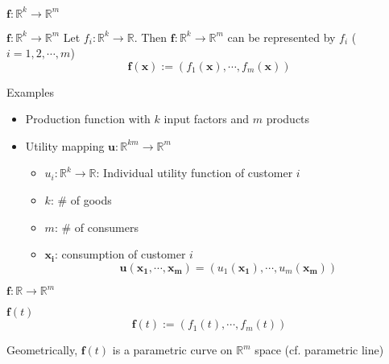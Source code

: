 \documentclass[a4paper,11pt]{article}
\begin{document}
\begin{frame}[t]{$\mathbf{f}:\mathbb{R}^k\rightarrow\mathbb{R}^m$}
	\begin{block}
		{$\mathbf{f}:\mathbb{R}^k\rightarrow\mathbb{R}^m$}
		Let $f_i: \mathbb{R}^k\rightarrow\mathbb{R}$. Then $\mathbf{f}:\mathbb{R}^k\rightarrow\mathbb{R}^m$ can be represented by $f_i$ ($i=1,2,\cdots,m$)
		\[
			\mathbf{f(x)}:=(f_1(\mathbf{x}),\cdots,f_m(\mathbf{x}))
		\]
	\end{block}
	\begin{block}
		{Examples}
		\begin{itemize}
			\item Production function with $k$ input factors and $m$ products
			\item Utility mapping $\mathbf{u}: \mathbb{R}^{km}\rightarrow\mathbb{R}^m$
			\begin{itemize}
				\item $u_i:\mathbb{R}^k\rightarrow\mathbb{R}$: Individual utility function of customer $i$
				\item $k$: \# of goods
				\item $m$: \# of consumers
				\item $\mathbf{x_i}$: consumption of customer $i$
				\[
					\mathbf{u}(\mathbf{x_1},\cdots,\mathbf{x_m})=(u_1(\mathbf{x_1}),\cdots,u_m(\mathbf{x_m}))
				\]
			\end{itemize}
		\end{itemize}
	\end{block}
\end{frame}
\begin{frame}[t]{$\mathbf{f}:\mathbb{R}\rightarrow\mathbb{R}^m$}
	\begin{block}
		{$\mathbf{f}(t)$}
		\[
			\mathbf{f}(t):=\left(f_1(t),\cdots,f_m(t)\right)
		\]
	\end{block}
	Geometrically, $\mathbf{f}(t)$ is a parametric curve on $\mathbb{R}^m$ space (cf. parametric line)
\end{frame}
\end{document}
